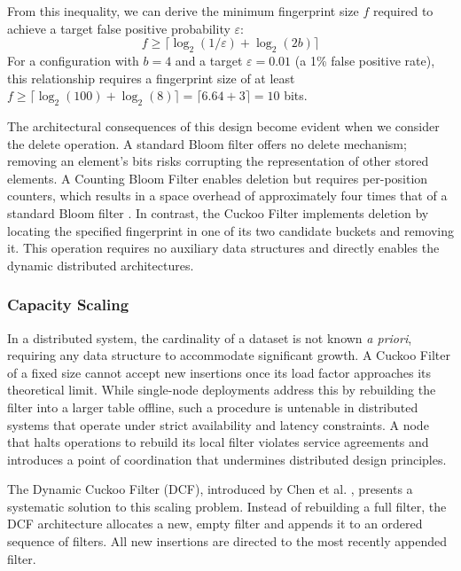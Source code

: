 From this inequality, we can derive the minimum fingerprint size $f$ required to achieve a target false positive probability $\varepsilon$:
\begin{equation*}
    f \geq \lceil \log_2(1/\varepsilon) + \log_2(2b) \rceil
\end{equation*}
For a configuration with $b=4$ and a target $\varepsilon=0.01$ (a 1\% false positive rate), this relationship requires a fingerprint size of at least $f \geq \lceil \log_2(100) + \log_2(8) \rceil = \lceil 6.64 + 3 \rceil = 10$ bits.

The architectural consequences of this design become evident when we consider the delete operation. A standard Bloom filter offers no delete mechanism; removing an element's bits risks corrupting the representation of other stored elements. A Counting Bloom Filter enables deletion but requires per-position counters, which results in a space overhead of approximately four times that of a standard Bloom filter \cite{Fan2014CuckooFP}. In contrast, the Cuckoo Filter implements deletion by locating the specified fingerprint in one of its two candidate buckets and removing it. This operation requires no auxiliary data structures and directly enables the dynamic distributed architectures.

\subsubsection{Capacity Scaling}

In a distributed system, the cardinality of a dataset is not known \emph{a priori}, requiring any data structure to accommodate significant growth. A Cuckoo Filter of a fixed size cannot accept new insertions once its load factor approaches its theoretical limit. While single-node deployments address this by rebuilding the filter into a larger table offline, such a procedure is untenable in distributed systems that operate under strict availability and latency constraints. A node that halts operations to rebuild its local filter violates service agreements and introduces a point of coordination that undermines distributed design principles.

The Dynamic Cuckoo Filter (DCF), introduced by Chen et al. \cite{Chen2017TheDC}, presents a systematic solution to this scaling problem. Instead of rebuilding a full filter, the DCF architecture allocates a new, empty filter and appends it to an ordered sequence of filters. All new insertions are directed to the most recently appended filter.

